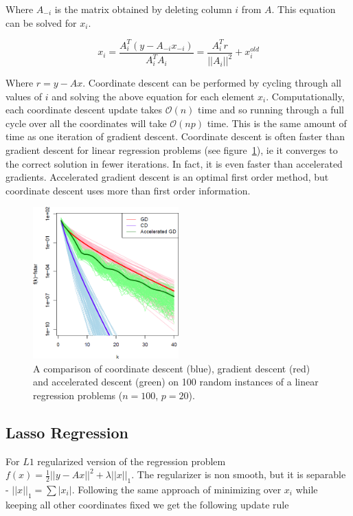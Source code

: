 \documentclass[twoside]{article}
\begin{document}
Where $A_{-i}$ is the matrix obtained by deleting column $i$ from $A$. This equation can  be solved for $x_i$.

\begin{equation*}
x_i = \frac{A_i^T(y-A_{-i}x_{-i})}{A_i^TA_i} = \frac{A_i^Tr}{||A_i||^2} + x_i^{old}
\end{equation*}

Where $r = y-Ax$. Coordinate descent can be performed by cycling through all values of $i$ and solving the above equation for each element $x_i$. Computationally, each coordinate descent update takes $\mathcal{O}(n)$ time and so running through a full cycle over all the coordinates will take $\mathcal{O}(np)$ time. This is the same amount of time as one iteration of gradient descent. Coordinate descent is often faster than gradient descent for linear regression problems (see figure~\ref{cgvsgd}), ie it converges to the correct solution in fewer iterations. In fact, it is even faster than accelerated gradients. Accelerated gradient descent is an optimal first order method, but coordinate descent uses more than first order information.

\begin{figure}[h!]
\label{cgvsgd}
\centering
\includegraphics[width=0.5\textwidth]{images/cd_vs_gd.png}
\caption{A comparison of coordinate descent (blue), gradient descent (red) and accelerated descent (green) on 100 random instances of a linear regression problems ($n = 100$, $p = 20$).}
\end{figure}

\subsection{Lasso Regression}

For $L1$ regularized version of the regression problem $f(x) = \frac{1}{2}||y-Ax||^2+\lambda ||x||_1$. The regularizer is non smooth, but it is separable - $||x||_1 = \sum |x_i|$. Following the same approach of minimizing over $x_i$ while keeping all other coordinates fixed we get the following update rule
\end{document}
